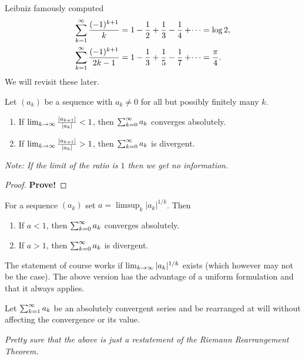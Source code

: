 \documentclass[10pt, a4paper]{article}
\begin{document}
\begin{remark}
    Leibniz famously computed
    \begin{align*}
        \infsum\frac{(-1) ^ {k + 1}}{k} &= 1 - \frac{1}{2} + \frac{1}{3} - \frac{1}{4} + \dotsi = \log{2}, \\
        \infsum\frac{(-1) ^ {k + 1}}{2k - 1} &= 1 - \frac{1}{3} + \frac{1}{5} - \frac{1}{7} + \dotsi = \frac{\pi}{4}.
    \end{align*}
    We will revisit these later.
\end{remark}

\begin{theorem}
    Let $(a_k)$ be a sequence with $a_k \neq 0$ for all but possibly finitely many $k$.
    \begin{enumerate}[label = (\roman*)]
        \item If $\liminfty[k]\frac{|a_{k + 1}|}{|a_k|} < 1$,
        then $\infsum[k = 0]a_k$ converges absolutely.
        \item If $\liminfty[k]\frac{|a_{k + 1}|}{|a_k|} > 1$,
        then $\infsum[k = 0]a_k$ is divergent.
    \end{enumerate}
    \textit{Note:
    If the limit of the ratio is $1$ then we get no information.}
    \begin{proof}
        \textbf{Prove!}
    \end{proof}
\end{theorem}

\begin{theorem}
    For a sequence $(a_k)$ set $a = \limsup_k|a_k| ^ {1 / k}$.
    Then
    \begin{enumerate}[label = (\roman*)]
        \item If $a < 1$,
        then $\infsum[k = 0]a_k$ converges absolutely.
        \item If $a > 1$,
        then $\infsum[k = 0]a_k$ is divergent.
    \end{enumerate}
\end{theorem}

\begin{remark}
    The statement of course works if $\liminfty[k]|a_k| ^ {1 / k}$ exists
    (which however may not be the case).
    The above version has the advantage of a uniform formulation and that it always applies.
\end{remark}

\begin{theorem}
    Let $\infsum a_k$ be an absolutely convergent series and be rearranged at will without affecting the convergence or its value.
\end{theorem}
\textit{Pretty sure that the above is just a restatement of the Riemann Rearrangement Theorem.}
\end{document}
